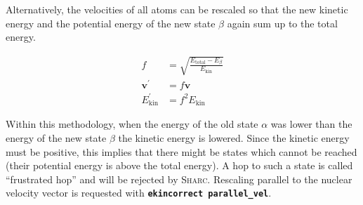 \documentclass[a4paper,11pt,DIV=15,openany,twoside=false]{scrbook}
\newcommand{\ttmdump}[1]{#1}
\newcommand{\sharc}{\textsc{Sharc}}
\newcommand{\ttt}[1]{\textbf{\texttt{#1}}}
\newcommand{\VEC}[1]{\ensuremath{\mathbf{#1}}}
\begin{document}
Alternatively, the velocities of all atoms can be rescaled so that the new kinetic energy and the potential energy of the new state $\beta$ again sum up to the total energy.
\ttmdump{
  \begin{align}
    f&=\sqrt{\frac{E_{\text{total}}-E_\beta}{E_{\text{kin}}}}\\
    \VEC{v}^\prime&=f\VEC{v}\\
    E_{\text{kin}}^\prime&=f^2E_{\text{kin}}
  \end{align}
}
Within this methodology, when the energy of the old state $\alpha$ was lower than the energy of the new state $\beta$ the kinetic energy is lowered. Since the kinetic energy must be positive, this implies that there might be states which cannot be reached (their potential energy is above the total energy). A hop to such a state is called ``frustrated hop'' and will be rejected by \sharc. Rescaling parallel to the nuclear velocity vector is requested with \ttt{ekincorrect parallel\_vel}.
\end{document}
